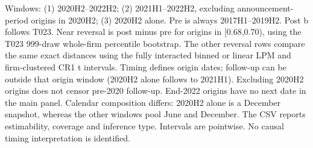 \begin{threeparttable}
\begin{tablenotes}[flushleft]
\item Windows: (1) 2020H2--2022H2; (2) 2021H1--2022H2, excluding announcement-period origins in 2020H2; (3) 2020H2 alone. Pre is always 2017H1--2019H2. Post b follows T023. Near reversal is post minus pre for origins in [0.68,0.70), using the T023 999-draw whole-firm percentile bootstrap. The other reversal rows compare the same exact distances using the fully interacted binned or linear LPM and firm-clustered CR1 t intervals. Timing defines origin dates; follow-up can be outside that origin window (2020H2 alone follows to 2021H1). Excluding 2020H2 origins does not censor pre-2020 follow-up. End-2022 origins have no next date in the main panel. Calendar composition differs: 2020H2 alone is a December snapshot, whereas the other windows pool June and December. The CSV reports estimability, coverage and inference type. Intervals are pointwise. No causal timing interpretation is identified.
\end{tablenotes}
\end{threeparttable}
